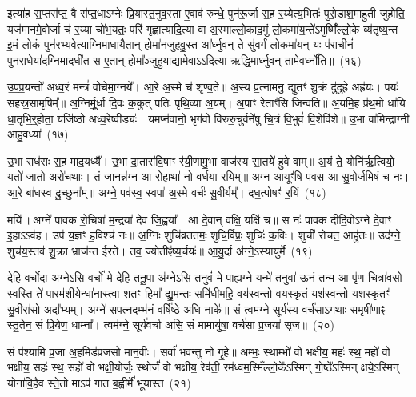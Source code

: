 इत्या॑ह स॒प्तस॑प्त॒ वै स॑प्त॒धा\-ऽग्नेः प्रि॒यास्त॒नुव॒स्ता ए॒वाव॑ रुन्धे॒ पुन॑रू॒र्जा स॒ह र॒य्येत्य॒भितः॑ पुरो॒डाश॒माहु॑ती जुहोति॒ यज॑मानमे॒वोर्जा च॑ र॒य्या चो॑भ॒यतः॒ परि॑ गृह्णात्यादि॒त्या वा अ॒स्माल्लो॒काद॒मुं लो॒कमा॑य॒न्ते॑\-ऽमुष्मिँ॑ल्लो॒के व्य॑तृष्य॒न्त इ॒मं लो॒कं पुन॑रभ्य॒\-वेत्या॒ग्नि\-मा॒धायै॒तान् होमा॑नजुहवु॒स्त आ᳚र्ध्नुव॒न् ते सु॑व॒र्गं लो॒कमा॑य॒न्॒ यः प॑रा॒चीनं॑ पुनरा॒धेया॑द॒ग्निमा॒दधी॑त॒ स ए॒तान् होमा᳚ञ्जुहुया॒द्यामे॒वा\-ऽ\-ऽदि॒त्या ऋद्धि॒मार्ध्नु॑व॒न् तामे॒वर्ध्नो॑ति॥~(१६)

{\anuvakamend[{ए॒तमे॒व जि॒ह्वा ए॒तान् पञ्च॑विꣳशतिश्च}]}%

उ॒प॒प्र॒यन्तो॑ अध्व॒रं मन्त्रं॑ वोचेमा॒ग्नये᳚। आ॒रे अ॒स्मे च॑ शृण्व॒ते॥ अ॒स्य प्र॒त्नामनु॒ द्युतꣳ॑ शु॒क्रं दु॑दुह्रे॒ अह्र॑यः। पयः॑ सहस्र॒सामृषिम्᳚॥ अ॒ग्निर्मू॒र्धा दि॒वः क॒कुत् पतिः॑ पृथि॒व्या अ॒यम्। अ॒पाꣳ रेताꣳ॑सि जिन्वति॥ अ॒यमि॒ह प्र॑थ॒मो धा॑यि धा॒तृभि॒र्॒\mbox{}होता॒ यजि॑ष्ठो अध्व॒रेष्वीड्यः॑। यमप्न॑वानो॒ भृग॑वो विरुरु॒चुर्वने॑षु चि॒त्रं वि॒भुवं॑ वि॒शेवि॑शे॥ उ॒भा वा॑मिन्द्राग्नी आहु॒वध्या॑~(१७)

उ॒भा राध॑सः स॒ह मा॑द॒यध्यै᳚। उ॒भा दा॒तारा॑वि॒षाꣳ र॑यी॒णामु॒भा वाज॑स्य सा॒तये॑ हुवे वाम्॥ अ॒यं ते॒ योनि॑र्\mbox{}ऋ॒त्वियो॒ यतो॑ जा॒तो अरो॑चथाः। तं जा॒नन्न॑ग्न॒ आ रो॒हाथा॑ नो वर्धया र॒यिम्॥ अग्न॒ आयूꣳ॑षि पवस॒ आ सु॒वोर्ज॒मिषं॑ च नः। आ॒रे बा॑धस्व दु॒च्छुना᳚म्॥ अग्ने॒ पव॑स्व॒ स्वपा॑ अ॒स्मे वर्चः॑ सु॒वीर्यम्᳚। दध॒त्पोषꣳ॑ र॒यिं~(१८)

मयि॑॥ अग्ने॑ पावक रो॒चिषा॑ म॒न्द्रया॑ देव जि॒ह्वया᳚। आ दे॒वान् व॑क्षि॒ यक्षि॑ च॥ स नः॑ पावक दीदि॒वो\-ऽग्ने॑ दे॒वाꣳ इ॒हा\-ऽ\-ऽव॑ह। उप॑ य॒ज्ञꣳ ह॒विश्च॑ नः॥ अ॒ग्निः शुचि॑व्रततमः॒ शुचि॒र्विप्रः॒ शुचिः॑ क॒विः। शुची॑ रोचत॒ आहु॑तः॥ उद॑ग्ने॒ शुच॑य॒स्तव॑ शु॒क्रा भ्राज॑न्त ईरते। तव॒ ज्योतीꣴ॑ष्य॒र्चयः॑॥ आ॒यु॒र्दा अ॑ग्ने॒\-ऽस्यायु॑र्मे~(१९)

देहि वर्चो॒दा अ॑ग्ने\-ऽसि॒ वर्चो॑ मे देहि तनू॒पा अ॑ग्ने\-ऽसि त॒नुवं॑ मे पा॒ह्यग्ने॒ यन्मे॑ त॒नुवा॑ ऊ॒नं तन्म॒ आ पृ॑ण॒ चित्रा॑वसो स्व॒स्ति ते॑ पा॒रम॑शी॒येन्धा॑नास्त्वा श॒तꣳ हिमा᳚ द्यु॒मन्तः॒ समि॑धीमहि॒ वय॑स्वन्तो वय॒स्कृतं॒ यश॑स्वन्तो यश॒स्कृतꣳ॑ सु॒वीरा॑सो॒ अदा᳚भ्यम्। अग्ने॑ सपत्न॒दम्भ॑नं॒ वर्\mbox{}षि॑ष्ठे॒ अधि॒ नाके᳚॥ सं त्वम॑ग्ने॒ सूर्य॑स्य॒ वर्च॑सा\-ऽगथाः॒ समृषी॑णाꣴ स्तु॒तेन॒ सं प्रि॒येण॒ धाम्ना᳚। त्वम॑ग्ने॒ सूर्य॑वर्चा असि॒ सं मामायु॑षा॒ वर्च॑सा प्र॒जया॑ सृज॥~(२०)

{\anuvakamend[{आ॒हु॒वध्यै॑ र॒यिं मे॒ वर्च॑सा स॒प्तद॑श च}]}%

सं प॑श्यामि प्र॒जा अ॒हमिड॑प्रजसो मान॒वीः। सर्वा॑ भवन्तु नो गृ॒हे॥ अम्भः॒ स्थाम्भो॑ वो भक्षीय॒ महः॑ स्थ॒ महो॑ वो भक्षीय॒ सहः॑ स्थ॒ सहो॑ वो भक्षी॒योर्जः॒ स्थोर्जं॑ वो भक्षीय॒ रेव॑ती॒ रम॑ध्वम॒स्मिँल्लो॒के᳚\-ऽस्मिन् गो॒ष्ठे᳚\-ऽस्मिन् क्षये॒\-ऽस्मिन् योना॑वि॒हैव स्ते॒तो मा\-ऽप॑ गात ब॒ह्वीर्मे॑ भूयास्त~(२१)

